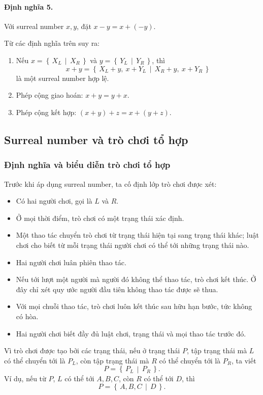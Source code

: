 \documentclass[11pt]{article}
\newcommand{\Gpos}[2]{\left\{\,#1\,\middle|\,#2\,\right\}}
\begin{document}
\paragraph{Định nghĩa 5.}
Với surreal number \(x,y\), đặt \(x-y=x+(-y)\).

Từ các định nghĩa trên suy ra:
\begin{enumerate}
  \item Nếu \(x=\Gpos{X_L}{X_R}\) và \(y=\Gpos{Y_L}{Y_R}\), thì
  \[
    x+y=\Gpos{X_L+y,\ x+Y_L}{X_R+y,\ x+Y_R}
  \]
  là một surreal number hợp lệ.
  \item Phép cộng giao hoán: \(x+y=y+x\).
  \item Phép cộng kết hợp: \((x+y)+z=x+(y+z)\).
\end{enumerate}

\subsection{Surreal number và trò chơi tổ hợp}

\subsubsection{Định nghĩa và biểu diễn trò chơi tổ hợp}

Trước khi áp dụng surreal number, ta cố định lớp trò chơi được xét:
\begin{itemize}
  \item Có hai người chơi, gọi là \(L\) và \(R\).
  \item Ở mọi thời điểm, trò chơi có một trạng thái xác định.
  \item Một thao tác chuyển trò chơi từ trạng thái hiện tại sang trạng thái
  khác; luật chơi cho biết từ mỗi trạng thái người chơi có thể tới những trạng
  thái nào.
  \item Hai người chơi luân phiên thao tác.
  \item Nếu tới lượt một người mà người đó không thể thao tác, trò chơi kết
  thúc. Ở đây chỉ xét quy ước người đầu tiên không thao tác được sẽ thua.
  \item Với mọi chuỗi thao tác, trò chơi luôn kết thúc sau hữu hạn bước, tức
  không có hòa.
  \item Hai người chơi biết đầy đủ luật chơi, trạng thái và mọi thao tác trước
  đó.
\end{itemize}

Vì trò chơi được tạo bởi các trạng thái, nếu ở trạng thái \(P\), tập trạng thái
mà \(L\) có thể chuyển tới là \(P_L\), còn tập trạng thái mà \(R\) có thể
chuyển tới là \(P_R\), ta viết
\[
  P=\Gpos{P_L}{P_R}.
\]
Ví dụ, nếu từ \(P\), \(L\) có thể tới \(A,B,C\), còn \(R\) có thể tới \(D\),
thì
\[
  P=\Gpos{A,B,C}{D}.
\]
\end{document}
